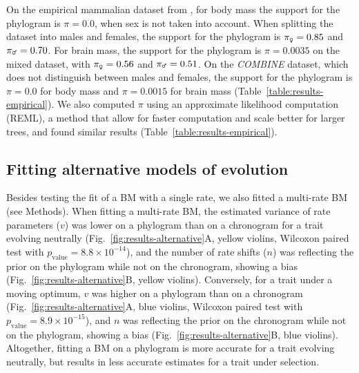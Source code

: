\documentclass{article}
\newcommand{\PhyloSupport}{\pi}
\begin{document}
On the empirical mammalian dataset from \citet{tsuboi_breakdown_2018}, for body mass the support for the phylogram is $\PhyloSupport = 0.0$, when sex is not taken into account.
When splitting the dataset into males and females, the support for the phylogram is $\PhyloSupport_{\text{\Female}} = 0.85$ and $\PhyloSupport_{\text{\Male}} = 0.70$.
For brain mass, the support for the phylogram is $\PhyloSupport = 0.0035$ on the mixed dataset, with $\PhyloSupport_{\text{\Female}} = 0.56$ and $\PhyloSupport_{\text{\Male}} = 0.51$.
On the \textit{COMBINE} dataset, which does not distinguish between males and females, the support for the phylogram is $\PhyloSupport = 0.0$ for body mass and $\PhyloSupport = 0.0015$ for brain mass (Table~\ref{table:results-empirical}).
We also computed $\PhyloSupport$ using an approximate likelihood computation (REML), a method that allow for faster computation and scale better for larger trees, and found similar results (Table~\ref{table:results-empirical}).


\subsection*{Fitting alternative models of evolution}
Besides testing the fit of a BM with a single rate, we also fitted a multi-rate BM (see Methods).
When fitting a multi-rate BM, the estimated variance of rate parameters ($v$) was lower on a phylogram than on a chronogram for a trait evolving neutrally (Fig.~\ref{fig:results-alternative}A, yellow violins, Wilcoxon paired test with $p_{\text{value}}=8.8\times 10^{-14}$), and the number of rate shifts ($n$) was reflecting the prior on the phylogram while not on the chronogram, showing a bias (Fig.~\ref{fig:results-alternative}B, yellow violins).
Conversely, for a trait under a moving optimum, $v$ was higher on a phylogram than on a chronogram (Fig.~\ref{fig:results-alternative}A, blue violins, Wilcoxon paired test with  $p_{\text{value}}=8.9\times 10^{-15}$), and $n$ was reflecting the prior on the chronogram while not on the phylogram, showing a bias (Fig.~\ref{fig:results-alternative}B, blue violins).
Altogether, fitting a BM on a phylogram is more accurate for a trait evolving neutrally, but results in less accurate estimates for a trait under selection.
\end{document}
